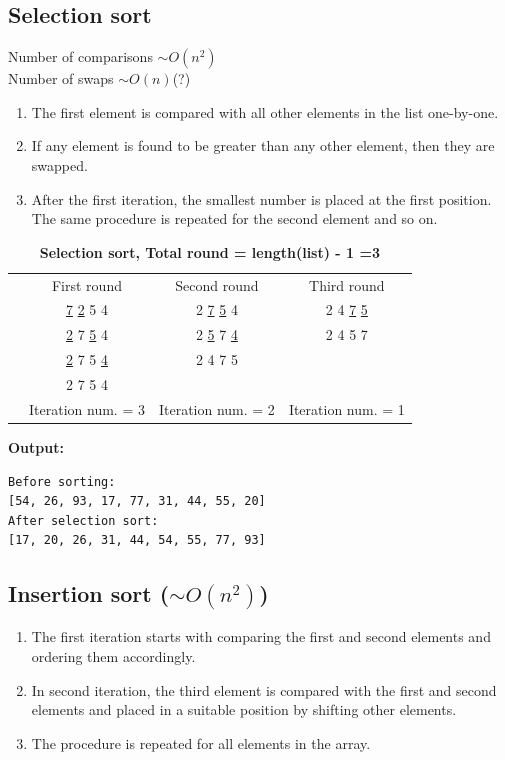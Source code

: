 \documentclass[12pt]{article}
\begin{document}
\subsection{Selection sort}
Number of comparisons $\sim O(n^2)$\\
Number of swaps $\sim O(n)$(?)
\begin{enumerate}
	\item The first element is compared with all other elements in the list one-by-one.
	\item If any element is found to be greater than any other element, then they are swapped.
	\item After the first iteration, the smallest number is placed at the first position. The same procedure is repeated for the second element and so on.
\end{enumerate}

\begin{table}[h]
	\label{Selection sort}
	\caption{\textbf{Selection sort, Total round = length(list) - 1 =3}}
	\vspace{2mm}
	\centering
	\begin{tabular}{cccc}
		&{First round}  &{Second round}  &{Third round}   \\
		&\underline{7} \underline{2} 5 4  &2 \underline{7} \underline{5} 4 &2 4 \underline{7} \underline{5}   \\
		&\underline{2} 7 \underline{5} 4 &2 \underline{5} 7 \underline{4}  &2 4 5 7   \\
		&\underline{2} 7 5 \underline{4}  &2 4 7 5 &   \\
		&2 7 5 4  & &\\
		&Iteration num. = 3 &Iteration num. = 2 &Iteration num. = 1 
	\end{tabular}
\end{table}


\textbf{Output:}
\begin{lstlisting}
Before sorting:
[54, 26, 93, 17, 77, 31, 44, 55, 20]
After selection sort:
[17, 20, 26, 31, 44, 54, 55, 77, 93]
\end{lstlisting}
\subsection{Insertion sort ($\sim O(n^2)$)}

\begin{enumerate}
	\item The first iteration starts with comparing the first and second elements and ordering them accordingly.
	\item In second iteration, the third element is compared with the first and second elements and placed in a suitable position by shifting other elements.
	\item The procedure is repeated for all elements in the array.
\end{enumerate}
\end{document}
